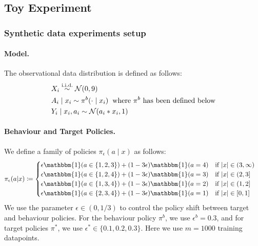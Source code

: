 \subsection{Toy Experiment}\label{sec:toy_experiments_descrip}
\subsubsection{Synthetic data experiments setup}
\paragraph{Model.}
The observational data distribution is defined as follows:
\begin{align}
    & X_i \overset{\textup{i.i.d.}}{\sim} \mathcal{N}(0,9) \nonumber \\
    & A_i \mid x_i \sim \pi^b(\cdot \mid x_i) \hspace{0.2cm} \textup{where $\pi^b$ has been defined below} \nonumber \\
    & Y_i \mid x_i, a_i \sim \mathcal{N}(a_i * x_i, 1) \nonumber
\end{align}

\paragraph{Behaviour and Target Policies.}
We define a family of policies $\pi_\epsilon(a \mid x)$ as follows:
\begin{align}
&\pi_\epsilon(a|x) \coloneqq
     \begin{cases}
          \epsilon\mathbbm{1}(a \in \{1,2,3\}) + (1-3\epsilon)\mathbbm{1}(a=4) &  \textup{if } |x|\in (3, \infty)\\
          \epsilon\mathbbm{1}(a \in \{1,2,4\}) + (1-3\epsilon)\mathbbm{1}(a=3) & \textup{if } |x|\in (2, 3]\\
          \epsilon\mathbbm{1}(a \in \{1,3,4\}) + (1-3\epsilon)\mathbbm{1}(a=2) & \textup{if } |x|\in (1, 2]\\
          \epsilon\mathbbm{1}(a \in \{2,3,4\}) + (1-3\epsilon)\mathbbm{1}(a=1) & \textup{if } |x|\in [0, 1]\\
          \end{cases} \nonumber
\end{align}
We use the parameter $\epsilon \in (0,1/3)$ to control the policy shift between target and behaviour policies. For the behaviour policy $\pi^b$, we use $\epsilon^b = 0.3$, and for target policies $\pi^*$, we use $\epsilon^* \in \{0.1, 0.2, 0.3\}$. Here we use $m=1000$ training datapoints.


